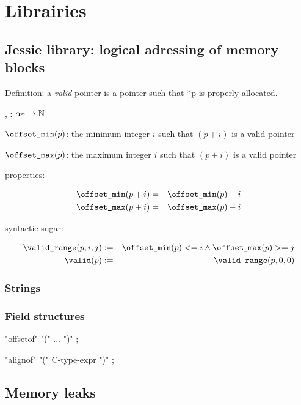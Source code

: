 \chapter{Librairies}
\label{chap:lib}

\section{Jessie library: logical adressing of memory blocks}

Definition: a \emph{valid} pointer is a pointer such that *p is properly
allocated.

\offsetmin, \offsetmax : $\alpha * \rightarrow \mathbb{N}$

$\texttt{{\textbackslash}offset\_min}(p)$: the minimum integer $i$ such that $(p+i)$ is a valid
pointer

$\texttt{{\textbackslash}offset\_max}(p)$: the maximum integer $i$ such that $(p+i)$ is a valid
pointer

properties:

\begin{eqnarray*}
\texttt{{\textbackslash}offset\_min}(p+i) &=& \texttt{{\textbackslash}offset\_min}(p)-i \\
\texttt{{\textbackslash}offset\_max}(p+i) &=& \texttt{{\textbackslash}offset\_max}(p)-i
\end{eqnarray*}

syntactic sugar:

\begin{eqnarray*}
\texttt{{\textbackslash}valid\_range}(p,i,j) &:=& \texttt{{\textbackslash}offset\_min}(p) <= i \land \texttt{{\textbackslash}offset\_max}(p) >= j \\
\texttt{{\textbackslash}valid}(p) &:=& \texttt{{\textbackslash}valid\_range}(p,0,0) 
\end{eqnarray*}


\subsection{Strings}

\strlen


\subsection{Field structures}

 "offsetof" "(" ... ")" ; \experimental

 "alignof" "(" C-type-expr ")" ; \experimental

\section{Memory leaks}

